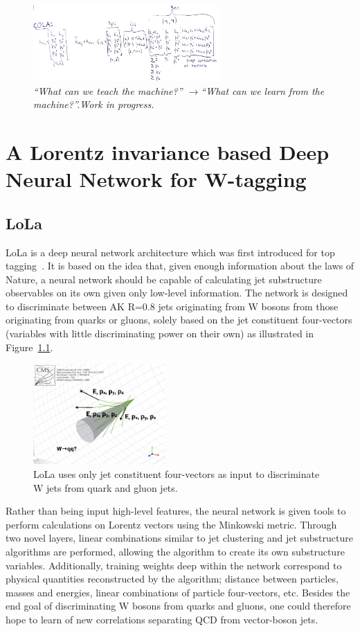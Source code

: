\begin{figure}[b!] 
    \centering
    \includegraphics[width=7.1cm]{figures/vtagging/misc/cola.png}
    \vspace*{5mm}
    \caption*{\footnotesize{\textit{ ``What can we teach the machine?'' $\rightarrow$``What can we learn from the machine?''.\newline Work in progress.}}}
\end{figure}
\clearpage
\chapter{A Lorentz invariance based Deep Neural Network for W-tagging}
\section{LoLa}
LoLa is a deep neural network architecture which was first introduced for top tagging~\cite{Butter:2017cot}. It is based on the idea that, given enough information about the laws of Nature, a neural network should be capable of calculating jet substructure observables on its own given only low-level information. The network is designed to discriminate between AK R=0.8 jets originating from W bosons from those originating from quarks or gluons, solely based on the jet constituent four-vectors (variables with little discriminating power on their own) as illustrated in Figure~\ref{fig:lola:4vec}.
\begin{figure}[h!]
\centering
\includegraphics[width=0.45\textwidth]{figures/vtagging/misc/4vec.png}
\caption{LoLa uses only jet constituent four-vectors as input to discriminate W jets from quark and gluon jets.}
\label{fig:lola:4vec}
\end{figure}
Rather than being input high-level features, the neural network is given tools to perform calculations on Lorentz vectors using the Minkowski metric. Through two novel layers, linear combinations similar to jet clustering and jet substructure algorithms are performed, allowing the algorithm to create its own substructure variables. Additionally, training weights deep within the network correspond to physical quantities reconstructed by the algorithm; distance between particles, masses and energies, linear combinations of particle four-vectors, etc.
Besides the end goal of discriminating W bosons from quarks and gluons, one could therefore hope to learn of new correlations separating QCD from vector-boson jets.

